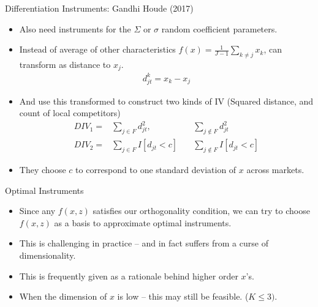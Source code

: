 \documentclass[aspectratio=169,11pt]{beamer}
\begin{document}
\begin{frame}{Differentiation Instruments: Gandhi Houde (2017)}
\begin{itemize}
\item Also need instruments for the $\Sigma$ or $\sigma$ random coefficient parameters.
\item Instead of average of other characteristics $f(x) = \frac{1}{J-1} \sum_{k \neq j} x_k$, can transform as distance to $x_j$.
\begin{eqnarray*}
d_{jt} ^k=  x_k - x_j  
\end{eqnarray*}
\item And use this transformed to construct two kinds of IV (Squared distance, and count of local competitors)
\begin{eqnarray*}
DIV_1 =& \sum_{j \in F}  d_{jt}^2,  \quad &\sum_{j \notin F}  d_{jt}^2 \\
DIV_2 =& \sum_{j \in F}  I[d_{jt} < c]   \quad &\sum_{j \notin F}   I[d_{jt} < c]
\end{eqnarray*}
\item They choose $c$ to correspond to one standard deviation of $x$ across markets.
\end{itemize}
\end{frame}


\begin{frame}{Optimal Instruments}
\begin{itemize}
\item Since any $f(x,z)$ satisfies our orthogonality condition, we can try to choose $f(x,z)$ as a \alert{basis} to approximate optimal instruments.
\item This is challenging in practice -- and in fact suffers from a curse of dimensionality.
\item This is frequently given as a rationale behind higher order $x$'s.
\item When the dimension of $x$ is low -- this may still be feasible. ($K \leq 3)$.
\end{itemize}
\end{frame}


\end{document}
